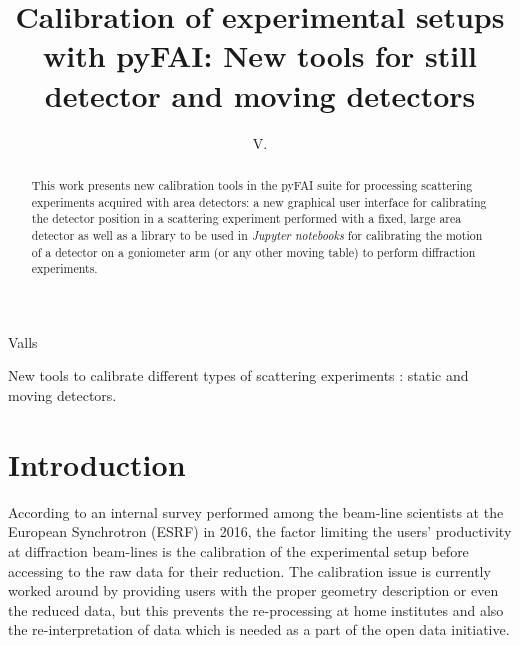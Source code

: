 \documentclass[preprint, pdf]{iucr}              %
\begin{document}

\title{Calibration of experimental setups with {pyFAI}: New tools for still
detector and moving detectors}

 \author[a]{V.}{Valls}
 
 





\maketitle                        %

\begin{synopsis}
New tools to calibrate different types of scattering experiments : static
and moving detectors.
\end{synopsis}

\begin{abstract}


This work presents new calibration tools in the pyFAI
suite for processing scattering experiments acquired with area detectors:
a new graphical user interface for calibrating the detector position in a  
scattering experiment performed with a fixed, large area detector as well as 
a library to be used in \textit{Jupyter notebooks} for calibrating the motion
of a detector on a goniometer arm (or any other moving table) to perform
diffraction experiments.
\end{abstract}


\section{Introduction}

According to an internal survey performed among the beam-line scientists at
the European Synchrotron (ESRF) in 2016, the factor limiting the users'
productivity at diffraction beam-lines is the calibration of the experimental
setup before accessing to the raw data for their reduction. 
The calibration issue is currently worked around by providing users with the
proper geometry description or even the reduced data, but this prevents the
re-processing at home institutes and also the re-interpretation of data which
is needed as a part of the open data initiative.
\end{document}
